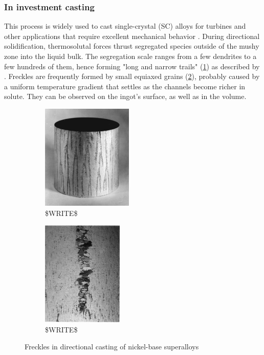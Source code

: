 \subsubsection*{In investment casting}
%
This process is widely used to cast single-crystal (SC) alloys for turbines and other applications 
that require excellent mechanical behavior \citep{giamei_nature_1970}.
During directional solidification, thermosolutal forces thrust segregated species outside of the 
mushy zone into the liquid bulk. The segregation scale ranges from a few dendrites to a few hundreds 
of them, hence forming "long and narrow trails" (\cref{fig:freckle1}) as described by \citet{felicelli_simulation_1991}. 
Freckles are frequently formed by small equiaxed grains (\cref{fig:freckle2}), probably caused by a uniform temperature gradient 
that settles as the channels become richer in solute. They can be observed on the ingot's surface, as well as in the volume.
\begin{figure}[htbp]
\centering
  \begin{subfigure}[t]{0.25\textwidth}
    \centering
	\includegraphics[height=5cm]{Chapter0/Graphics/freckle1.png}
	\caption{\$WRITE\$}
    \label{fig:freckle1}
  \end{subfigure}
   \qquad %
   \begin{subfigure}[t]{0.25\textwidth}
    \centering
	\includegraphics[height=5cm]{Chapter0/Graphics/freckle2.png}
	\caption{\$WRITE\$}
    \label{fig:freckle2}
  \end{subfigure}
\caption{Freckles in directional casting of nickel-base superalloys} 
\label{fig:freckle}
\end{figure}
%
%
